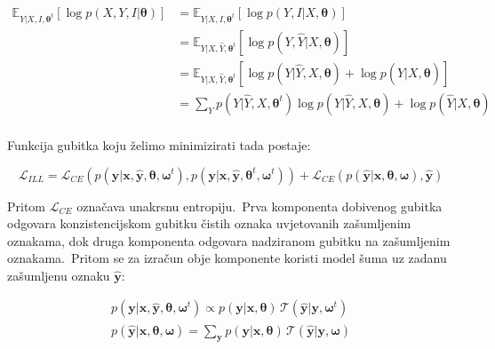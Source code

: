 \documentclass[diplomskirad]{fer}
\begin{document}
\begin{equation}
  \begin{aligned}
    \mathbb{E}_{Y | X, I, \bm{\theta}^t} \left[ \log p(X, Y, I | \bm{\theta}) \right] &= \mathbb{E}_{Y | X, I, \bm{\theta}^t} \left[ \log p(Y, I | X, \bm{\theta}) \right] \\
    &= \mathbb{E}_{Y | X, \hat{Y}, \bm{\theta}^t} \left[ \log p(Y, \hat{Y} | X, \bm{\theta}) \right] \\
    &= \mathbb{E}_{Y | X, \hat{Y}, \bm{\theta}^t} \left[ \log p(Y | \hat{Y}, X, \bm{\theta}) + \log p(\hat{Y} | X, \bm{\theta}) \right] \\
    &= \sum_{Y} p(Y | \hat{Y}, X, \bm{\theta}^t) \log p(Y | \hat{Y}, X, \bm{\theta}) + \log p(\hat{Y} | X, \bm{\theta}) \\
  \end{aligned}
  \label{eq:ill_target}
\end{equation}

Funkcija gubitka koju želimo minimizirati tada postaje:

\begin{equation}
  \mathcal{L}_{ILL} = \mathcal{L}_{CE} (p(\bm{y} | \bm{x}, \bm{\hat{y}}, \bm{\theta}, \bm{\omega}^t), p(\bm{y} | \bm{x}, \bm{\hat{y}}, \bm{\theta}^t, \bm{\omega}^t)) + \mathcal{L}_{CE} (p(\bm{\hat{y}} | \bm{x}, \bm{\theta}, \bm{\omega}), \bm{\hat{y}})
  \label{eq:ill_loss}
\end{equation}

Pritom $\mathcal{L}_{CE}$ označava unakrsnu entropiju.\ Prva komponenta dobivenog gubitka odgovara konzistencijskom gubitku čistih oznaka uvjetovanih zašumljenim oznakama, dok druga komponenta odgovara nadziranom gubitku na zašumljenim oznakama.\ 
Pritom se za izračun obje komponente koristi model šuma uz zadanu zašumljenu oznaku $\bm{\hat{y}}$:

\begin{equation}
  \begin{aligned}
    p(\bm{y} | \bm{x}, \bm{\hat{y}}, \bm{\theta}, \bm{\omega}^t) \propto p(\bm{y} | \bm{x}, \bm{\theta}) \, \mathcal{T}(\bm{\hat{y}} | \bm{y}, \bm{\omega}^t) \\
    p(\bm{\hat{y}} | \bm{x}, \bm{\theta}, \bm{\omega}) = \sum_{\bm{y}} p(\bm{y} | \bm{x}, \bm{\theta}) \, \mathcal{T}(\bm{\hat{y}} | \bm{y}, \bm{\omega})
  \end{aligned}
  \label{eq:ill_probs}
\end{equation}

\end{document}
